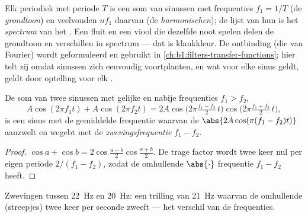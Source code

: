 \begin{remark}[Spectrum]\label{rem:b1:wave-propagation:spectrum}
Elk periodiek  met periode $T$ is een som van sinussen met frequenties
$f_1 = 1/T$ (de \emph{grondtoon}) en veelvouden $nf_1$ daarvan (de
\emph{harmonischen}); de lijst van hun  is het \emph{spectrum} van
het . Een fluit en een viool die dezelfde noot spelen delen de
grondtoon en verschillen in spectrum --- dat is klankkleur. De ontbinding
(die van Fourier) wordt geformuleerd en gebruikt in
\cref{ch:b1:filters-transfer-functions}; hier telt zij omdat sinussen zich
eenvoudig voortplanten, en wat voor elke sinus geldt, geldt door optelling
voor elk .
\end{remark}

\begin{proposition}[Zwevingen]\label{prop:b1:wave-propagation:beats}
De som van twee sinussen met gelijke  en nabije frequenties
$f_1 > f_2$,
\[
A\cos(2\pi f_1 t) + A\cos(2\pi f_2 t)
= 2A\cos\!\big(2\pi\tfrac{f_1 - f_2}{2}\,t\big)\cos\!\big(2\pi\tfrac{f_1 + f_2}{2}\,t\big),
\]
is een sinus met de gemiddelde frequentie waarvan de 
$\abs{2A\cos(\pi(f_1 - f_2)t)}$ aanzwelt en wegebt met de
\emph{zwevingsfrequentie} $f_1 - f_2$.
\end{proposition}

\begin{proof}
$\cos a + \cos b = 2\cos\frac{a - b}{2}\cos\frac{a + b}{2}$. De trage
factor wordt twee keer nul per eigen periode $2/(f_1 - f_2)$, zodat de
omhullende $\abs{\cdot}$ frequentie $f_1 - f_2$ heeft.
\end{proof}

\begin{omfigure}

{\small Zwevingen tussen \qty{22}{Hz} en \qty{20}{Hz}: een trilling van
\qty{21}{Hz} waarvan de omhullende (streepjes) twee keer per seconde zweeft ---
het verschil van de frequenties.}
\end{omfigure}

